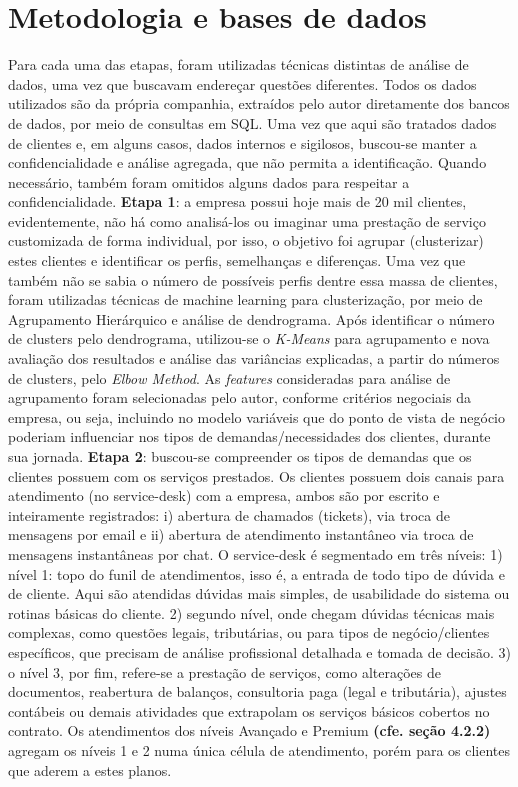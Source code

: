 \documentclass[twocolumn]{rbef}
\newcommand{\1}{\mathbbm{1}}
\begin{document}
\section{Metodologia e bases de dados} \label{Sessao3}

Para cada uma das etapas, foram utilizadas técnicas distintas de análise de dados, uma vez que buscavam endereçar questões diferentes.
Todos os dados utilizados são da própria companhia, extraídos pelo autor diretamente dos bancos de dados, por meio de consultas em SQL. Uma vez que aqui são tratados dados de clientes e, em alguns casos, dados internos e sigilosos, buscou-se manter a confidencialidade e análise agregada, que não permita a identificação. Quando necessário, também foram omitidos alguns dados para respeitar a confidencialidade.
\newline\linebreak\textbf{Etapa 1}: a empresa possui hoje mais de 20 mil clientes, evidentemente, não há como analisá-los ou imaginar uma prestação de serviço customizada de forma individual, por isso, o objetivo foi agrupar (clusterizar) estes clientes e identificar os perfis, semelhanças e diferenças. Uma vez que também não se sabia o número de possíveis perfis dentre essa massa de clientes, foram utilizadas técnicas de machine learning para clusterização, por meio de Agrupamento Hierárquico e análise de dendrograma. Após identificar o número de clusters pelo dendrograma, utilizou-se o \emph{K-Means} para agrupamento e nova avaliação dos resultados e análise das variâncias explicadas, a partir do números de clusters, pelo \emph{Elbow Method}. As \emph{features} consideradas para análise de agrupamento foram selecionadas pelo autor, conforme critérios negociais da empresa, ou seja, incluindo no modelo variáveis que do ponto de vista de negócio poderiam influenciar nos tipos de demandas/necessidades dos clientes, durante sua jornada.
\newline\linebreak\textbf{Etapa 2}: buscou-se compreender os tipos de demandas que os clientes possuem com os serviços prestados. Os clientes possuem dois canais para atendimento (no service-desk) com a empresa, ambos são por escrito e inteiramente registrados: i) abertura de chamados (tickets), via troca de mensagens por email e ii) abertura de atendimento instantâneo via troca de mensagens instantâneas por chat.
O service-desk é segmentado em três níveis: 1) nível 1: topo do funil de atendimentos, isso é, a entrada de todo tipo de dúvida e de cliente. Aqui são atendidas dúvidas mais simples, de usabilidade do sistema ou rotinas básicas do cliente. 2) segundo nível, onde chegam dúvidas técnicas mais complexas, como questões legais, tributárias, ou para tipos de negócio/clientes específicos, que precisam de análise profissional detalhada e tomada de decisão. 3) o nível 3, por fim, refere-se a prestação de serviços, como alterações de documentos, reabertura de balanços, consultoria paga (legal e tributária), ajustes contábeis ou demais atividades que extrapolam os serviços básicos cobertos no contrato. Os atendimentos dos níveis Avançado e Premium \textbf{(cfe. seção 4.2.2)} agregam os níveis 1 e 2 numa única célula de atendimento, porém para os clientes que aderem a estes planos.
\end{document}
